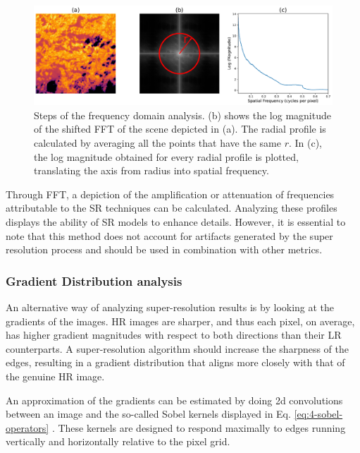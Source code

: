         \begin{figure}[H]
            \centering
            \includegraphics[width=\linewidth]{Includes/4-frequency-analysis.pdf}
            \caption{Steps of the frequency domain analysis. (b) shows the log magnitude of the shifted FFT of the scene depicted in (a). The radial profile is calculated by averaging all the points that have the same $r$. In (c), the log magnitude obtained for every radial profile is plotted, translating the axis from radius into spatial frequency.}
            \label{fig:4-frequency-analysis}
        \end{figure}
        

        Through FFT, a depiction of the amplification or attenuation of frequencies attributable to the SR techniques can be calculated. 
        Analyzing these profiles displays the ability of SR models to enhance details. 
        However, it is essential to note that this method does not account for artifacts generated by the super resolution process and should be used in combination with other metrics.

        \subsubsection{Gradient Distribution analysis}


        An alternative way of analyzing super-resolution results is by looking at the gradients of the images. 
        HR images are sharper, and thus each pixel, on average, has higher gradient magnitudes with respect to both directions than their LR counterparts.
        A super-resolution algorithm should increase the sharpness of the edges, resulting in a gradient distribution that aligns more closely with that of the genuine HR image.
        
        An approximation of the gradients can be estimated by doing 2d convolutions between an image and the so-called Sobel kernels displayed in Eq. \ref{eq:4-sobel-operators} \cite{Sobel1990AnI3}.
        These kernels are designed to respond maximally to edges running vertically and horizontally relative to the pixel grid.
        
